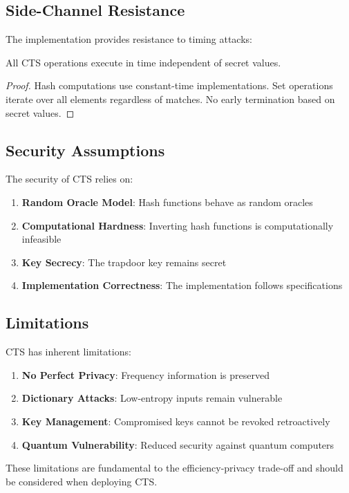 \documentclass[../main_comprehensive.tex]{subfiles}
\begin{document}
\subsection{Side-Channel Resistance}

The implementation provides resistance to timing attacks:

\begin{theorem}
All CTS operations execute in time independent of secret values.
\end{theorem}

\begin{proof}
Hash computations use constant-time implementations. Set operations iterate over all elements regardless of matches. No early termination based on secret values.
\end{proof}

\subsection{Security Assumptions}

The security of CTS relies on:
\begin{enumerate}
\item \textbf{Random Oracle Model}: Hash functions behave as random oracles
\item \textbf{Computational Hardness}: Inverting hash functions is computationally infeasible
\item \textbf{Key Secrecy}: The trapdoor key remains secret
\item \textbf{Implementation Correctness}: The implementation follows specifications
\end{enumerate}

\subsection{Limitations}

CTS has inherent limitations:
\begin{enumerate}
\item \textbf{No Perfect Privacy}: Frequency information is preserved
\item \textbf{Dictionary Attacks}: Low-entropy inputs remain vulnerable
\item \textbf{Key Management}: Compromised keys cannot be revoked retroactively
\item \textbf{Quantum Vulnerability}: Reduced security against quantum computers
\end{enumerate}

These limitations are fundamental to the efficiency-privacy trade-off and should be considered when deploying CTS.
\end{document}
